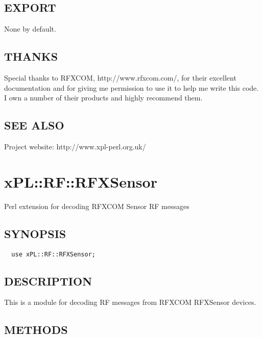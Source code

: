 \subsection*{EXPORT\label{xPL::RF::RFXMeter_EXPORT}}


None by default.

\subsection*{THANKS\label{xPL::RF::RFXMeter_THANKS}}


Special thanks to RFXCOM, \textsf{http://www.rfxcom.com/}, for their
excellent documentation and for giving me permission to use it to help
me write this code.  I own a number of their products and highly
recommend them.

\subsection*{SEE ALSO\label{xPL::RF::RFXMeter_SEE_ALSO}}


Project website: http://www.xpl-perl.org.uk/

\section{xPL::RF::RFXSensor\label{xPL::RF::RFXSensor}}


Perl extension for decoding RFXCOM Sensor RF messages

\subsection*{SYNOPSIS\label{xPL::RF::RFXSensor_SYNOPSIS}}
\begin{verbatim}
  use xPL::RF::RFXSensor;
\end{verbatim}
\subsection*{DESCRIPTION\label{xPL::RF::RFXSensor_DESCRIPTION}}


This is a module for decoding RF messages from RFXCOM RFXSensor devices.

\subsection*{METHODS\label{xPL::RF::RFXSensor_METHODS}}

